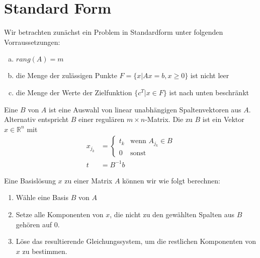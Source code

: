 \section{Standard Form}
Wir betrachten zunächst ein Problem in Standardform unter folgenden Vorraussetzungen:
\begin{enumerate}[(a)]
	\item $rang(A) = m$\label{vorr:a}
	\item die Menge der zulässigen Punkte $F = \{x| Ax=b, x\geq0\}$ ist nicht leer\label{vorr:b}
	\item die Menge der Werte der Zielfunktion $\{c^T|x \in F\}$ ist nach unten beschränkt\label{vorr:c}
\end{enumerate}
\begin{definition}
Eine  $B$ von $A$ ist eine Auswahl von linear unabhängigen Spaltenvektoren aus $A$. Alternativ entspricht $B$ einer regulären $m\times n$-Matrix.
Die  zu $B$ ist ein Vektor $x\in \mathbb R^n$ mit 
\begin{align*}
x_{j_k} &= \begin{cases}
t_k &\text{wenn }A_{j_k} \in B \\
0 &\text{sonst}
\end{cases}\\
t &= B^{-1}b
\end{align*}
\end{definition}

Eine Basislösung $x$ zu einer Matrix $A$ können wir wie folgt berechnen:
\begin{enumerate}
\item Wähle eine Basis $B$ von $A$
\item Setze alle Komponenten von $x$, die nicht zu den gewählten Spalten aus $B$ gehören auf $0$.
\item Löse das resultierende Gleichungssystem, um die restlichen Komponenten von $x$ zu bestimmen.
\end{enumerate}

